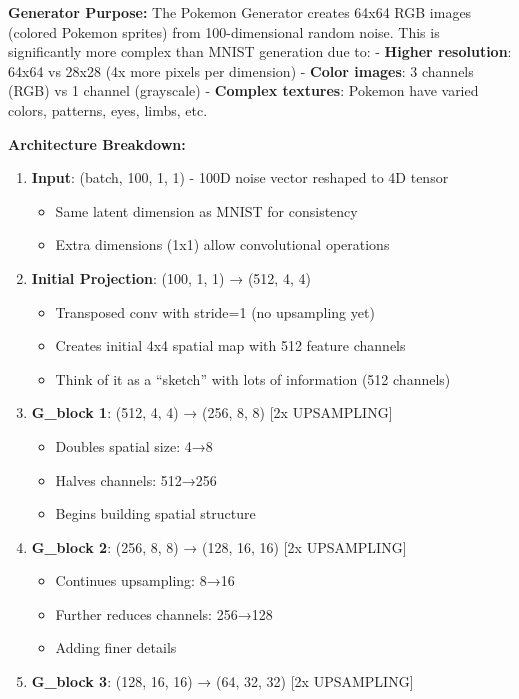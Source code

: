 \documentclass[11pt]{article}
\providecommand{\tightlist}{%
      \setlength{\itemsep}{0pt}\setlength{\parskip}{0pt}}
\begin{document}
\textbf{Generator Purpose:} The Pokemon Generator creates 64x64 RGB
images (colored Pokemon sprites) from 100-dimensional random noise. This
is significantly more complex than MNIST generation due to: -
\textbf{Higher resolution}: 64x64 vs 28x28 (4x more pixels per
dimension) - \textbf{Color images}: 3 channels (RGB) vs 1 channel
(grayscale) - \textbf{Complex textures}: Pokemon have varied colors,
patterns, eyes, limbs, etc.

\textbf{Architecture Breakdown:}

\begin{enumerate}
\def\labelenumi{\arabic{enumi}.}
\tightlist
\item
  \textbf{Input}: (batch, 100, 1, 1) - 100D noise vector reshaped to 4D
  tensor

  \begin{itemize}
  \tightlist
  \item
    Same latent dimension as MNIST for consistency
  \item
    Extra dimensions (1x1) allow convolutional operations
  \end{itemize}
\item
  \textbf{Initial Projection}: (100, 1, 1) → (512, 4, 4)

  \begin{itemize}
  \tightlist
  \item
    Transposed conv with stride=1 (no upsampling yet)
  \item
    Creates initial 4x4 spatial map with 512 feature channels
  \item
    Think of it as a ``sketch'' with lots of information (512 channels)
  \end{itemize}
\item
  \textbf{G\_block 1}: (512, 4, 4) → (256, 8, 8) {[}2x UPSAMPLING{]}

  \begin{itemize}
  \tightlist
  \item
    Doubles spatial size: 4→8
  \item
    Halves channels: 512→256
  \item
    Begins building spatial structure
  \end{itemize}
\item
  \textbf{G\_block 2}: (256, 8, 8) → (128, 16, 16) {[}2x UPSAMPLING{]}

  \begin{itemize}
  \tightlist
  \item
    Continues upsampling: 8→16
  \item
    Further reduces channels: 256→128
  \item
    Adding finer details
  \end{itemize}
\item
  \textbf{G\_block 3}: (128, 16, 16) → (64, 32, 32) {[}2x UPSAMPLING{]}


\end{enumerate}
\end{document}
